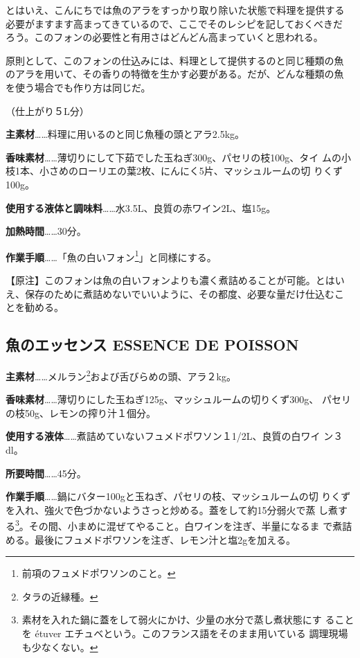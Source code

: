 \documentclass[twoside,12Q,b5paper]{escoffierltjsbook}
\newenvironment{recette}{\begin{multicols}{2}}{\end{multicols}}
\begin{document}
\begin{recette}
とはいえ、こんにちでは魚のアラをすっかり取り除いた状態で料理を提供する
必要がますます高まってきているので、ここでそのレシピを記しておくべきだ
ろう。このフォンの必要性と有用さはどんどん高まっていくと思われる。

原則として、このフォンの仕込みには、料理として提供するのと同じ種類の魚
のアラを用いて、その香りの特徴を生かす必要がある。だが、どんな種類の魚
を使う場合でも作り方は同じだ。

（仕上がり５L分）

\textbf{主素材}\ldots{}\ldots{}料理に用いるのと同じ魚種の頭とアラ2.5kg。

\textbf{香味素材}\ldots{}\ldots{}薄切りにして下茹でした玉ねぎ300g、パセリの枝100g、タイ
ムの小枝1本、小さめのローリエの葉2枚、にんにく5片、マッシュルームの切
りくず100g。

\textbf{使用する液体と調味料}\ldots{}\ldots{}水3.5L、良質の赤ワイン2L、塩15g。

\textbf{加熱時間}\ldots{}\ldots{}30分。

\textbf{作業手順}\ldots{}\ldots{}「魚の白いフォン\footnote{前項のフュメドポワソンのこと。}」と同様にする。

【原注】このフォンは魚の白いフォンよりも濃く煮詰めることが可能。とはい
え、保存のために煮詰めないでいいように、その都度、必要な量だけ仕込むこ
とを勧める。

\subsection{魚のエッセンス ESSENCE DE
POISSON}\label{ux9b5aux306eux30a8ux30c3ux30bbux30f3ux30b9-essence-de-poisson}

\textbf{主素材}\ldots{}\ldots{}メルラン\footnote{タラの近縁種。}および舌びらめの頭、アラ２kg。

\textbf{香味素材}\ldots{}\ldots{}薄切りにした玉ねぎ125g、マッシュルームの切りくず300g、
パセリの枝50g、レモンの搾り汁１個分。

\textbf{使用する液体}\ldots{}\ldots{}煮詰めていないフュメドポワソン１1/2L、良質の白ワイ
ン３dl。

\textbf{所要時間}\ldots{}\ldots{}45分。

\textbf{作業手順}\ldots{}\ldots{}鍋にバター100gと玉ねぎ、パセリの枝、マッシュルームの切
りくずを入れ、強火で色づかないようさっと炒める。蓋をして約15分弱火で蒸
し煮する\footnote{素材を入れた鍋に蓋をして弱火にかけ、少量の水分で蒸し煮状態にす
  ることを étuver エチュベという。このフランス語をそのまま用いている
  調理現場も少なくない。}。その間、小まめに混ぜてやること。白ワインを注ぎ、半量になるま
で煮詰める。最後にフュメドポワソンを注ぎ、レモン汁と塩2gを加える。


\end{recette}
\end{document}
